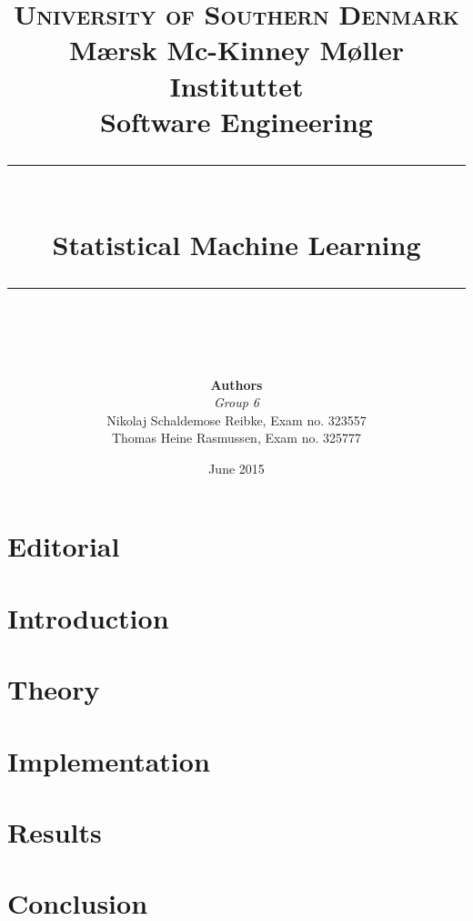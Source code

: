 \documentclass[11pt]{article}
\newcommand{\romanTitle}[1]{\MakeUppercase{\thepage}\hspace{0.2cm}#1}
\begin{document}
\title {
	\textsc{\LARGE University of Southern Denmark}\\
	\large Mærsk Mc-Kinney Møller Instituttet\\[1cm]
	\Large Software Engineering\\
	\rule{\linewidth}{0.4pt}\\[0.4cm]Statistical Machine Learning\\\rule{\linewidth}{0.4pt}\\[0.5cm] }

\author{ 
	\textbf{Authors}\\\textit{Group 6}\\Nikolaj Schaldemose Reibke,  Exam no. 323557\\Thomas Heine Rasmussen, Exam no. 325777
}
\date{\vfill June 2015}
\maketitle
\thispagestyle{empty}
\clearpage
\setcounter{page}{1}

\pagestyle{fancy}
\setlength{\headheight}{25.2pt} 


\rfoot{}
\cfoot{\MakeUppercase{\thepage}}
\lfoot{}

\section*{Editorial}

\newpage

\renewcommand\contentsname{\romanTitle{Table of contents}}
\tableofcontents
\newpage

\setcounter{page}{1}
\rfoot{}
\lfoot{}

\section{Introduction}


\section{Theory}


\section{Implementation}


\section{Results}


\section{Conclusion}

\end{document}

